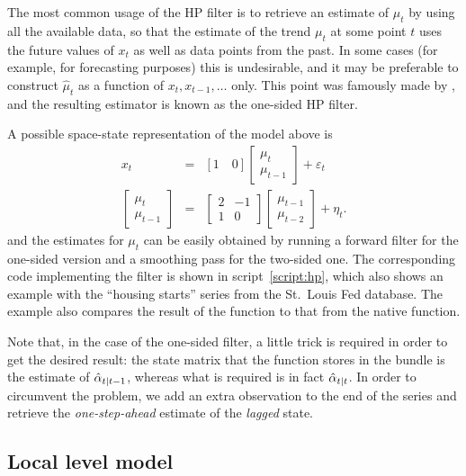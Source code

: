 The most common usage of the HP filter is to retrieve an estimate of
$\mu_t$ by using all the available data, so that the estimate of the
trend $\mu_t$ at some point $t$ uses the future values of $x_t$ as
well as data points from the past. In some cases (for example, for
forecasting purposes) this is undesirable, and it may be preferable to
construct $\hat{\mu}_t$ as a function of $x_t, x_{t-1}, \ldots$
only. This point was famously made by \cite{stock-watson1999}, and the
resulting estimator is known as the one-sided HP filter.

A possible space-state representation of the model above is
\begin{eqnarray*}
  x_t & = & [1 \quad 0]
            \left[ \begin{array}{c} \mu_t \\ \mu_{t-1}\end{array}\right]
  + \varepsilon_t \\
  \left[ \begin{array}{c} \mu_t \\ \mu_{t-1}\end{array}\right] & = &
  \left[ \begin{array}{rr} 2 & -1 \\ 1 & 0 \end{array}\right]
  \left[ \begin{array}{c} \mu_{t-1} \\ \mu_{t-2}\end{array}\right] +
  \eta_t .
\end{eqnarray*}
and the estimates for $\mu_t$ can be easily obtained by running a
forward filter for the one-sided version and a smoothing pass for the
two-sided one. The corresponding code implementing the filter is shown
in script~\ref{script:hp}, which also shows an example with the
``housing starts'' series from the St.~Louis Fed database. The example
also compares the result of the function to that from the native
 function.

Note that, in the case of the one-sided filter, a little trick is
required in order to get the desired result: the state matrix that the
 function stores in the bundle is the estimate of
$\hat{\alpha}_{t|t-1}$, whereas what is required is in fact
$\hat{\alpha}_{t|t}$. In order to circumvent the problem, we add an
extra observation to the end of the series and retrieve the
\emph{one-step-ahead} estimate of the \emph{lagged} state.

\subsection{Local level model}
\label{sec:example_loclev}

